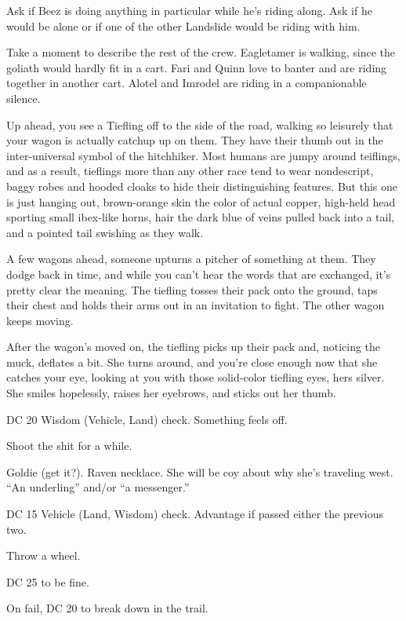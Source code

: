 \begin{multicols}{2}
Ask if Beez is doing anything in particular while he's riding along.
Ask if he would be alone or if one of the other Landslide would be riding with him.

Take a moment to describe the rest of the crew.
Eagletamer is walking, since the goliath would hardly fit in a cart.
Fari and Quinn love to banter and are riding together in another cart.
Alotel and Imrodel are riding in a companionable silence.

  \begin{aloud}
  Up ahead, you see a Tiefling off to the side of the road,
    walking so leisurely that your wagon is actually catchup up on them.
  They have their thumb out in the inter-universal symbol of the hitchhiker.
  Most humans are jumpy around teiflings, and as a result, tieflings more than any other race tend
    to wear nondescript, baggy robes and hooded cloaks to hide their distinguishing features.
  But this one is just hanging out, brown-orange skin the color of actual copper,
    high-held head sporting small ibex-like horns,
    hair the dark blue of veins pulled back into a tail,
    and a pointed tail swishing as they walk.

  A few wagons ahead, someone upturns a pitcher of something at them.
  They dodge back in time, and while you can't hear the words that are exchanged, it's pretty clear
    the meaning.
  The tiefling tosses their pack onto the ground, taps their chest and holds their arms out in
    an invitation to fight.
  The other wagon keeps moving.

  After the wagon's moved on, the tiefling picks up their pack and, noticing the muck, deflates
    a bit.
  She turns around, and you're close enough now that she catches your eye, looking at you with
    those solid-color tiefling eyes, hers silver.
  She smiles hopelessly, raises her eyebrows, and sticks out her thumb.
  \end{aloud}

DC 20 Wisdom (Vehicle, Land) check.
Something feels off.

Shoot the shit for a while.

Goldie (get it?).
Raven necklace.
She will be coy about why she's traveling west.
``An underling'' and/or ``a messenger.''

DC 15 Vehicle (Land, Wisdom) check.
Advantage if passed either the previous two.

Throw a wheel.

DC 25 to be fine.

On fail, DC 20 to break down in the trail.


\end{multicols}
